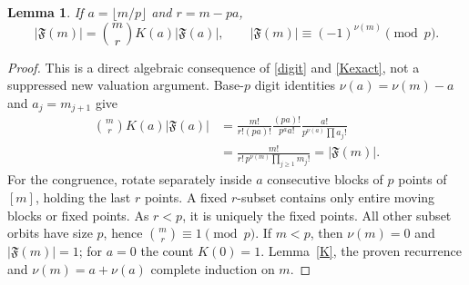 \documentclass[10pt]{article}
\newtheorem{lemma}{Lemma}
\theoremstyle{definition}\newtheorem*{definition}{Definition}
\theoremstyle{remark}\newtheorem*{remark}{Remark}
\newcommand{\F}{\mathfrak F}
\begin{document}
\begin{lemma}\label{recursion} If $a=\lfloor m/p\rfloor$ and $r=m-pa$,
\begin{equation}\label{forest}
 |\F(m)|=\binom mrK(a)|\F(a)|,\qquad
 |\F(m)|\equiv(-1)^{\nu(m)}\pmod p.
\end{equation}\end{lemma}
\begin{proof} This is a direct algebraic consequence of \eqref{digit} and
\eqref{Kexact}, not a suppressed new valuation argument. Base-$p$ digit
identities $\nu(a)=\nu(m)-a$ and $a_j=m_{j+1}$ give
\begin{align*}
\binom mrK(a)|\F(a)|
&=\frac{m!}{r!(pa)!}\frac{(pa)!}{p^a a!}
 \frac{a!}{p^{\nu(a)}\prod a_j!}\\
&=\frac{m!}{r!\,p^{\nu(m)}\prod_{j\ge1}m_j!}=|\F(m)|.
\end{align*}
For the congruence, rotate separately inside $a$ consecutive blocks of $p$
points of $[m]$, holding the last $r$ points. A fixed $r$-subset contains only
entire moving blocks or fixed points. As $r<p$, it is uniquely the fixed points.
All other subset orbits have size $p$, hence $\binom mr\equiv1\pmod p$.
If $m<p$, then $\nu(m)=0$ and $|\F(m)|=1$; for $a=0$ the count $K(0)=1$.
Lemma~\ref{K}, the proven recurrence and $\nu(m)=a+\nu(a)$ complete induction
on $m$.\end{proof}
\end{document}
